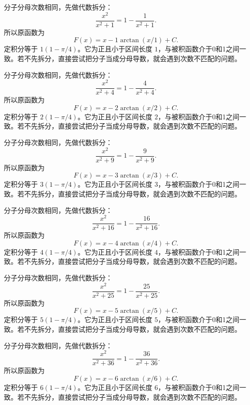 \documentclass[12pt,fontset=fandol]{ctexart}
\begin{document}
\begin{solve}\label{ans:c15q19}
分子分母次数相同，先做代数拆分：
\[
\frac{x^2}{x^2+1}=1-\frac{1}{x^2+1}.
\]
所以原函数为
\[
F(x)=x-1\arctan(x/1)+C.
\]
定积分等于 $1(1-\pi/4)$。它为正且小于区间长度 $1$，与被积函数介于0和1之间一致。若不先拆分，直接尝试把分子当成分母导数，就会遇到次数不匹配的问题。
\end{solve}

\begin{solve}\label{ans:c15q20}
分子分母次数相同，先做代数拆分：
\[
\frac{x^2}{x^2+4}=1-\frac{4}{x^2+4}.
\]
所以原函数为
\[
F(x)=x-2\arctan(x/2)+C.
\]
定积分等于 $2(1-\pi/4)$。它为正且小于区间长度 $2$，与被积函数介于0和1之间一致。若不先拆分，直接尝试把分子当成分母导数，就会遇到次数不匹配的问题。
\end{solve}

\begin{solve}\label{ans:c15q21}
分子分母次数相同，先做代数拆分：
\[
\frac{x^2}{x^2+9}=1-\frac{9}{x^2+9}.
\]
所以原函数为
\[
F(x)=x-3\arctan(x/3)+C.
\]
定积分等于 $3(1-\pi/4)$。它为正且小于区间长度 $3$，与被积函数介于0和1之间一致。若不先拆分，直接尝试把分子当成分母导数，就会遇到次数不匹配的问题。
\end{solve}

\begin{solve}\label{ans:c15q22}
分子分母次数相同，先做代数拆分：
\[
\frac{x^2}{x^2+16}=1-\frac{16}{x^2+16}.
\]
所以原函数为
\[
F(x)=x-4\arctan(x/4)+C.
\]
定积分等于 $4(1-\pi/4)$。它为正且小于区间长度 $4$，与被积函数介于0和1之间一致。若不先拆分，直接尝试把分子当成分母导数，就会遇到次数不匹配的问题。
\end{solve}

\begin{solve}\label{ans:c15q23}
分子分母次数相同，先做代数拆分：
\[
\frac{x^2}{x^2+25}=1-\frac{25}{x^2+25}.
\]
所以原函数为
\[
F(x)=x-5\arctan(x/5)+C.
\]
定积分等于 $5(1-\pi/4)$。它为正且小于区间长度 $5$，与被积函数介于0和1之间一致。若不先拆分，直接尝试把分子当成分母导数，就会遇到次数不匹配的问题。
\end{solve}

\begin{solve}\label{ans:c15q24}
分子分母次数相同，先做代数拆分：
\[
\frac{x^2}{x^2+36}=1-\frac{36}{x^2+36}.
\]
所以原函数为
\[
F(x)=x-6\arctan(x/6)+C.
\]
定积分等于 $6(1-\pi/4)$。它为正且小于区间长度 $6$，与被积函数介于0和1之间一致。若不先拆分，直接尝试把分子当成分母导数，就会遇到次数不匹配的问题。
\end{solve}
\end{document}
